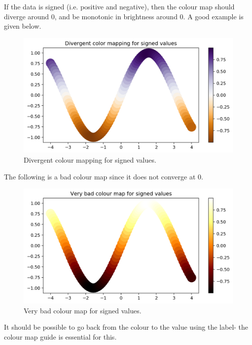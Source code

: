\documentclass[a4paper, openany]{memoir}
\begin{document}
If the data is signed (i.e. positive and negative), then the colour map should diverge around 0, and be monotonic in brightness around 0. A good example is given below.
\begin{figure}[H]
    \centering
    \includegraphics[scale=0.5]{src/2.45 Divergent colour mappings for signed values.png}
    \caption{Divergent colour mapping for signed values.}
\end{figure}
\noindent The following is a bad colour map since it does not converge at 0.
\begin{figure}[H]
    \centering
    \includegraphics[scale=0.5]{src/2.46 Very bad colour map for signed values.png}
    \caption{Very bad colour map for signed values.}
\end{figure}
\noindent It should be possible to go back from the colour to the value using the label- the colour map guide is essential for this.
\end{document}
